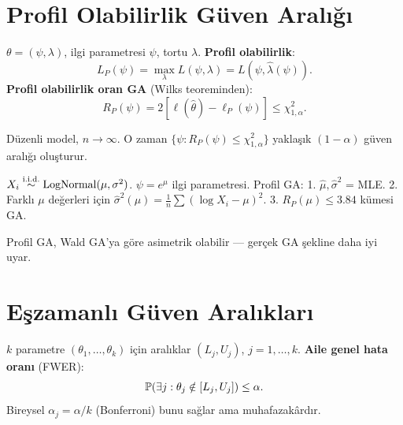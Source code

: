 \section{Profil Olabilirlik Güven Aralığı}
\label{sec:profil_ga}

\begin{tanim}\label{def:profil_likh}
$\theta=(\psi,\lambda)$, ilgi parametresi $\psi$, tortu $\lambda$. \textbf{Profil olabilirlik}:
\[
  L_P(\psi) = \max_{\lambda} L(\psi,\lambda) = L(\psi,\hat\lambda(\psi)).
\]
\textbf{Profil olabilirlik oran GA} (Wilks teoreminden):
\[
  R_P(\psi) = 2[\ell(\hat\theta) - \ell_P(\psi)] \leq \chi^2_{1,\alpha}.
\]
\end{tanim}

\begin{teorem}\label{thm:wilks_profil}
Düzenli model, $n\to\infty$. O zaman $\{\psi: R_P(\psi)\leq\chi^2_{1,\alpha}\}$ yaklaşık $(1-\alpha)$ güven aralığı oluşturur.
\end{teorem}

\begin{ornek}\label{ex:profil_lognormal}
$X_i\overset{\text{i.i.d.}}{\sim}\mathrm{LogNormal}(\mu,\sigma^2)$. $\psi=e^\mu$ ilgi parametresi. Profil GA:
1. $\hat\mu,\hat\sigma^2$ = MLE. 2. Farklı $\mu$ değerleri için $\hat\sigma^2(\mu)=\frac1n\sum(\log X_i-\mu)^2$. 3. $R_P(\mu)\leq3.84$ kümesi GA.

Profil GA, Wald GA'ya göre asimetrik olabilir --- gerçek GA şekline daha iyi uyar.
\end{ornek}

\section{Eşzamanlı Güven Aralıkları}
\label{sec:esz_ga}

\begin{tanim}[Eşzamanlı GA]\label{def:esz_ga}
$k$ parametre $(\theta_1,\ldots,\theta_k)$ için aralıklar $(L_j,U_j)$, $j=1,\ldots,k$. \textbf{Aile genel hata oranı} (FWER):
\[
  \mathbb{P}(\exists j: \theta_j\notin[L_j,U_j]) \leq \alpha.
\]
Bireysel $\alpha_j=\alpha/k$ (Bonferroni) bunu sağlar ama muhafazakârdır.
\end{tanim}

